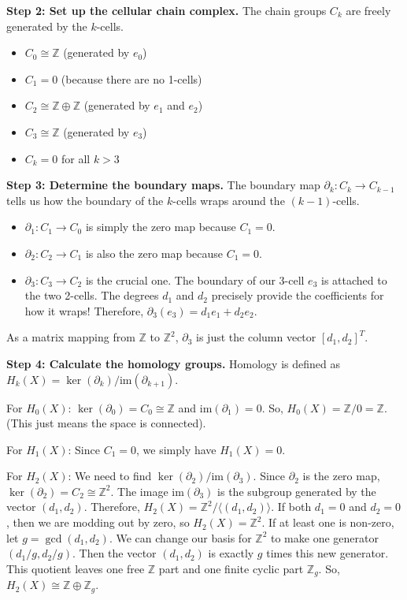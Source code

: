 \begin{solution}
\textbf{Step 2: Set up the cellular chain complex.}
The chain groups $C_k$ are freely generated by the $k$-cells.
\begin{itemize}
    \item $C_0 \cong \mathbb{Z}$ (generated by $e_0$)
    \item $C_1 = 0$ (because there are no 1-cells)
    \item $C_2 \cong \mathbb{Z} \oplus \mathbb{Z}$ (generated by $e_1$ and $e_2$)
    \item $C_3 \cong \mathbb{Z}$ (generated by $e_3$)
    \item $C_k = 0$ for all $k > 3$
\end{itemize}

\textbf{Step 3: Determine the boundary maps.}
The boundary map $\partial_k: C_k \to C_{k-1}$ tells us how the boundary of the $k$-cells wraps around the $(k-1)$-cells.
\begin{itemize}
    \item $\partial_1: C_1 \to C_0$ is simply the zero map because $C_1 = 0$.
    \item $\partial_2: C_2 \to C_1$ is also the zero map because $C_1 = 0$.
    \item $\partial_3: C_3 \to C_2$ is the crucial one. The boundary of our 3-cell $e_3$ is attached to the two 2-cells. The degrees $d_1$ and $d_2$ precisely provide the coefficients for how it wraps! Therefore, $\partial_3(e_3) = d_1 e_1 + d_2 e_2$.
\end{itemize}
As a matrix mapping from $\mathbb{Z}$ to $\mathbb{Z}^2$, $\partial_3$ is just the column vector $[d_1, d_2]^T$.

\textbf{Step 4: Calculate the homology groups.}
Homology is defined as $H_k(X) = \ker(\partial_k) / \mathrm{im}(\partial_{k+1})$.

For $H_0(X)$: $\ker(\partial_0) = C_0 \cong \mathbb{Z}$ and $\mathrm{im}(\partial_1) = 0$. So, $H_0(X) = \mathbb{Z} / 0 = \mathbb{Z}$. (This just means the space is connected).

For $H_1(X)$: Since $C_1 = 0$, we simply have $H_1(X) = 0$.

For $H_2(X)$: We need to find $\ker(\partial_2) / \mathrm{im}(\partial_3)$.
Since $\partial_2$ is the zero map, $\ker(\partial_2) = C_2 \cong \mathbb{Z}^2$.
The image $\mathrm{im}(\partial_3)$ is the subgroup generated by the vector $(d_1, d_2)$.
Therefore, $H_2(X) = \mathbb{Z}^2 / \langle(d_1, d_2)\rangle$.
If both $d_1 = 0$ and $d_2 = 0$, then we are modding out by zero, so $H_2(X) = \mathbb{Z}^2$.
If at least one is non-zero, let $g = \gcd(d_1, d_2)$. We can change our basis for $\mathbb{Z}^2$ to make one generator $(d_1/g, d_2/g)$. Then the vector $(d_1, d_2)$ is exactly $g$ times this new generator. This quotient leaves one free $\mathbb{Z}$ part and one finite cyclic part $\mathbb{Z}_g$. So, $H_2(X) \cong \mathbb{Z} \oplus \mathbb{Z}_g$.


\end{solution}
